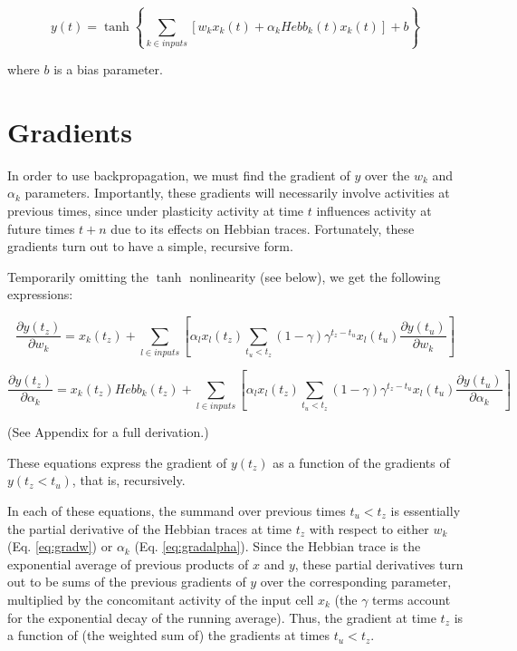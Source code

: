 \documentclass{article}
\begin{document}
\begin{equation}
\label{eq:y}
y(t) = \tanh\left\{\sum_{k \in inputs}[w_k x_k(t) + \alpha_k Hebb_k(t) x_k(t)] +
b\right\}
\end{equation}


where $b$ is a bias parameter. 


\section{Gradients}

In order to use backpropagation, we must find the gradient of $y$ over the
$w_k$ and $\alpha_k$ parameters. Importantly, these gradients will necessarily
involve activities at previous times, since under plasticity activity at time
$t$ influences activity at future times $t+n$ due to its effects on Hebbian
traces. Fortunately, these gradients turn out to have a simple, recursive form. 

Temporarily omitting the $\tanh$ nonlinearity (see below), we get the
following expressions: 

\begin{equation}
\label{eq:gradw}
\frac{\partial y(t_z)}{\partial w_k} = x_k(t_z) + \sum_{l \in inputs}[\alpha_l
x_l(t_z) \sum_{t_u<t_z}(1-\gamma) \gamma^{t_z-t_u} x_l(t_u) \frac{\partial
y(t_u)}{\partial w_k}]
\end{equation}

\begin{equation}
\label{eq:gradalpha}
\frac{\partial y(t_z)}{\partial \alpha_k} = x_k(t_z) Hebb_k(t_z) + \sum_{l \in inputs}
[\alpha_l x_l(t_z) \sum_{t_u<t_z}(1-\gamma) \gamma^{t_z-t_u} x_l(t_u) \frac{\partial
y(t_u)}{\partial \alpha_k}]
\end{equation}

(See Appendix for a full derivation.)

These equations express the gradient of $y(t_z)$ as a function of the gradients
of $y(t_z<t_u)$, that is, recursively.

In each of these equations, the summand over previous times $t_u<t_z$ is
essentially the partial derivative of the Hebbian traces at time $t_{z}$
with respect to either $w_k$ (Eq. \ref{eq:gradw}) or $\alpha_k$ (Eq.
\ref{eq:gradalpha}). Since the Hebbian trace is the exponential average of
previous products of $x$ and $y$, these partial derivatives turn out to be
sums of the previous gradients of $y$ over the corresponding parameter,
multiplied by the concomitant activity of the input cell $x_k$ (the $\gamma$ terms
account for the exponential decay of the running average). Thus, the gradient at
time $t_z$ is a function of (the weighted sum of) the gradients at times
$t_u<t_z$.
\end{document}
